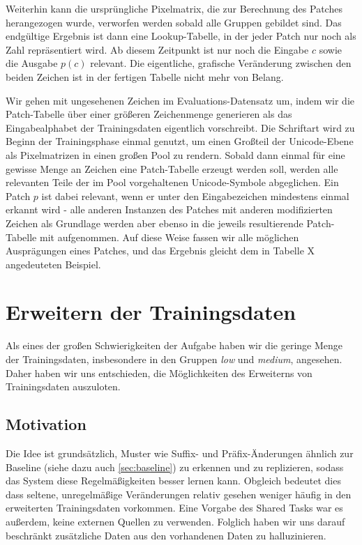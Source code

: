 \documentclass[11pt,a4paper]{article}
\begin{document}
Weiterhin kann die ursprüngliche Pixelmatrix, die zur Berechnung des Patches herangezogen wurde, verworfen werden sobald alle Gruppen gebildet sind. Das endgültige Ergebnis ist dann eine Lookup-Tabelle, in der jeder Patch nur noch als Zahl repräsentiert wird. Ab diesem Zeitpunkt ist nur noch die Eingabe $c$ sowie die Ausgabe $p(c)$ relevant. Die eigentliche, grafische Veränderung zwischen den beiden Zeichen ist in der fertigen Tabelle nicht mehr von Belang.

Wir gehen mit ungesehenen Zeichen im Evaluations-Datensatz um, indem wir die Patch-Tabelle über einer größeren Zeichenmenge generieren als das Eingabealphabet der Trainingsdaten eigentlich vorschreibt. Die Schriftart wird zu Beginn der Trainingsphase einmal genutzt, um einen Großteil der Unicode-Ebene als Pixelmatrizen in einen großen Pool zu rendern. Sobald dann einmal für eine gewisse Menge an Zeichen eine Patch-Tabelle erzeugt werden soll, werden alle relevanten Teile der im Pool vorgehaltenen Unicode-Symbole abgeglichen. Ein Patch $p$ ist dabei relevant, wenn er unter den Eingabezeichen mindestens einmal erkannt wird - alle anderen Instanzen des Patches mit anderen modifizierten Zeichen als Grundlage werden aber ebenso in die jeweils resultierende Patch-Tabelle mit aufgenommen.
Auf diese Weise fassen wir alle möglichen Ausprägungen eines Patches, und das Ergebnis gleicht dem in Tabelle X angedeuteten Beispiel. 

\section{Erweitern der Trainingsdaten}
\label{sec:enhancer}

Als eines der großen Schwierigkeiten der Aufgabe haben wir die geringe Menge der Trainingsdaten, insbesondere in den Gruppen \textit{low} und \textit{medium}, angesehen. Daher haben wir uns entschieden, die Möglichkeiten des Erweiterns von Trainingsdaten auszuloten.

\subsection{Motivation}
Die Idee ist grundsätzlich, Muster wie Suffix- und Präfix-Änderungen ähnlich zur Baseline (siehe dazu auch \autoref{sec:baseline}) zu erkennen und zu replizieren, sodass das System diese Regelmäßigkeiten besser lernen kann. Obgleich bedeutet dies dass seltene, unregelmäßige Veränderungen relativ gesehen weniger häufig in den erweiterten Trainingsdaten vorkommen.
Eine Vorgabe des Shared Tasks war es außerdem, keine externen Quellen zu verwenden. Folglich haben wir uns darauf beschränkt zusätzliche Daten aus den vorhandenen Daten zu halluzinieren.
\end{document}
